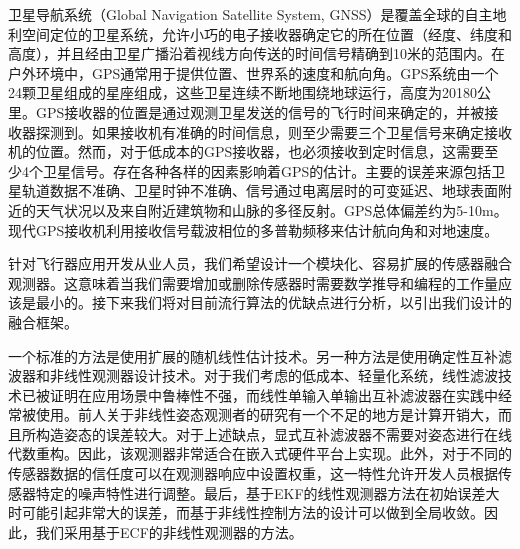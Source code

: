 \documentclass[
  type=master
]{gdutthesis}
\begin{document}
卫星导航系统（Global Navigation Satellite System, GNSS）是覆盖全球的自主地利空间定位的卫星系统，允许小巧的电子接收器确定它的所在位置（经度、纬度和高度），并且经由卫星广播沿着视线方向传送的时间信号精确到10米的范围内。在户外环境中，GPS通常用于提供位置、世界系的速度和航向角。GPS系统由一个24颗卫星组成的星座组成，这些卫星连续不断地围绕地球运行，高度为20180公里。GPS接收器的位置是通过观测卫星发送的信号的飞行时间来确定的，并被接收器探测到。如果接收机有准确的时间信息，则至少需要三个卫星信号来确定接收机的位置。然而，对于低成本的GPS接收器，也必须接收到定时信息，这需要至少4个卫星信号。存在各种各样的因素影响着GPS的估计。主要的误差来源包括卫星轨道数据不准确、卫星时钟不准确、信号通过电离层时的可变延迟、地球表面附近的天气状况以及来自附近建筑物和山脉的多径反射。GPS总体偏差约为5-10m。现代GPS接收机利用接收信号载波相位的多普勒频移来估计航向角和对地速度\cite{wendel2006integrated}。

针对飞行器应用开发从业人员，我们希望设计一个模块化、容易扩展的传感器融合观测器。这意味着当我们需要增加或删除传感器时需要数学推导和编程的工作量应该是最小的。接下来我们将对目前流行算法的优缺点进行分析，以引出我们设计的融合框架。

一个标准的方法是使用扩展的随机线性估计技术\cite{lefferts1982kalman,barshan1995inertial}。另一种方法是使用确定性互补滤波器和非线性观测器设计技术\cite{zimmermann1992high,baerveldt1997low,vik2001nonlinear}。对于我们考虑的低成本、轻量化系统，线性滤波技术已被证明在应用场景中鲁棒性不强\cite{roberts2003low}，而线性单输入单输出互补滤波器在实践中经常被使用\cite{saripalli2003tale,corke2004inertial}。前人关于非线性姿态观测者的研究有一个不足的地方是计算开销大，而且所构造姿态的误差较大。对于上述缺点，显式互补滤波器不需要对姿态进行在线代数重构。因此，该观测器非常适合在嵌入式硬件平台上实现。此外，对于不同的传感器数据的信任度可以在观测器响应中设置权重，这一特性允许开发人员根据传感器特定的噪声特性进行调整。最后，基于EKF的线性观测器方法在初始误差大时可能引起非常大的误差，而基于非线性控制方法的设计可以做到全局收敛。因此，我们采用基于ECF的非线性观测器的方法\cite{mahony2008nonlinear}。
\end{document}
